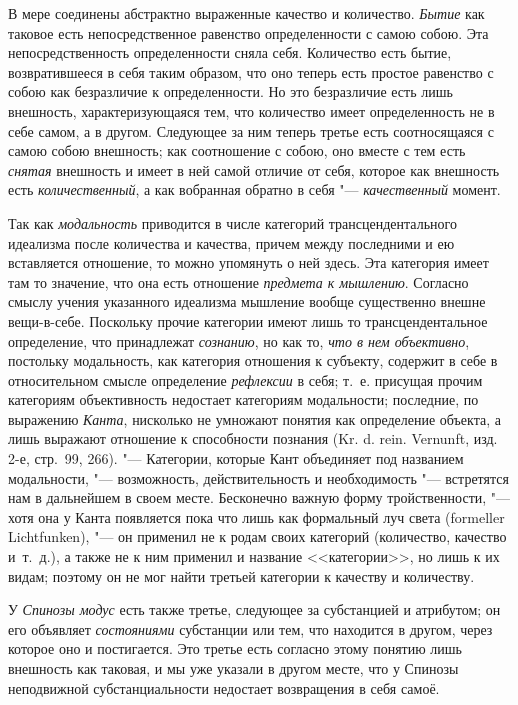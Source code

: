 
В мере соединены абстрактно выраженные качество
и количество. {\em Бытие} как таковое есть
непосредственное равенство определенности с самою собою. Эта
непосредственность определенности сняла себя. Количество есть бытие,
возвратившееся в себя таким образом, что оно теперь есть простое равенство
с собою как безразличие к определенности. Но это безразличие есть лишь
внешность, характеризующаяся тем, что количество имеет определенность не в
себе самом, а в другом. Следующее за ним теперь третье есть соотносящаяся с
самою собою внешность; как соотношение с собою, оно вместе с тем есть
{\em снятая} внешность и имеет в ней самой отличие от
себя, которое как внешность есть {\em количественный},
а как вобранная обратно в себя "--- {\em качественный} момент.

Так как {\em модальность} приводится в числе категорий
трансцендентального идеализма после количества и качества, причем между
последними и ею вставляется отношение, то можно упомянуть о ней здесь. Эта
категория имеет там то значение, что она есть отношение
{\em предмета к мышлению}. Согласно смыслу учения
указанного идеализма мышление вообще существенно внешне вещи-в-себе.
Поскольку прочие категории имеют лишь то трансцендентальное определение,
что принадлежат {\em сознанию}, но как то,
{\em что в нем объективно}, постольку модальность, как
категория отношения к субъекту, содержит в себе в относительном смысле
определение {\em рефлексии} в себя; т.~е. присущая
прочим категориям объективность недостает категориям модальности;
последние, по выражению {\em Канта}, нисколько не
умножают понятия как определение объекта, а лишь выражают отношение к
способности познания (Kr. d. rein. Vernunft, изд. 2-е, стр.~99, 266). "---
Категории, которые Кант объединяет под названием модальности, "---
возможность, действительность и необходимость "--- встретятся нам в дальнейшем
в своем месте. Бесконечно важную форму тройственности, "--- хотя она у Канта
появляется пока что лишь как формальный луч света (formeller Lichtfunken),
"--- он применил не к родам своих категорий (количество, качество и~т.~д.), а
также не к ним применил и название <<категории>>, но лишь к их видам; поэтому
он не мог найти третьей категории к качеству и количеству.

У {\em Спинозы модус} есть
также третье, следующее за субстанцией и атрибутом; он его объявляет
{\em состояниями} субстанции или тем, что находится в
другом, через которое оно и постигается. Это третье есть согласно этому
понятию лишь внешность как таковая, и мы уже указали в другом месте, что у
Спинозы неподвижной субстанциальности недостает возвращения в себя самоё.

